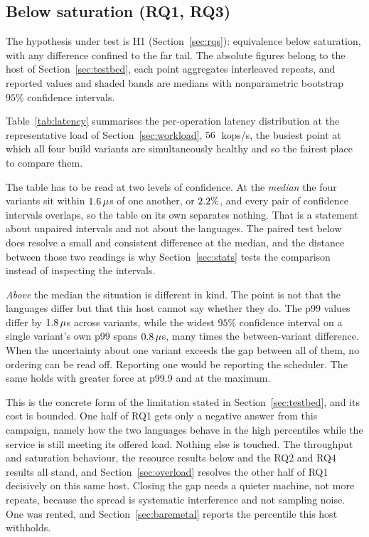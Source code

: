 \documentclass[english,oneside,a4paper,censored,csm,software-track-2020]{HYthesisML}
\begin{document}
\subsection{Below saturation (RQ1, RQ3)}\label{sec:perfresults}
The hypothesis under test is H1 (Section~\ref{sec:rqs}): equivalence below saturation, with any
difference confined to the far tail. The absolute figures belong to the host of
Section~\ref{sec:testbed}, each point aggregates \NRepeats{} interleaved repeats, and reported
values and shaded bands are medians with nonparametric bootstrap $95\%$ confidence intervals.

Table~\ref{tab:latency} summarises the per-operation latency distribution at the representative
load of Section~\ref{sec:workload}, $56$~kops/s, the busiest point at which all four build
variants are simultaneously healthy and so the fairest place to compare them.

The table has to be read at two levels of confidence. At the \emph{median} the four variants sit
within $1.6\,\mu$s of one another, or $2.2\%$, and every pair of confidence
intervals overlaps, so the table on its own separates nothing.
That is a statement about unpaired intervals and not about the languages. The paired test
below does resolve a small and consistent difference at the median, and the distance between
those two readings is why Section~\ref{sec:stats} tests the comparison instead of
inspecting the intervals.

\emph{Above} the median the situation is different in kind. The point is not that the languages
differ but that this host cannot say whether they do. The p99 values differ by
$1.8\,\mu$s across variants, while the widest $95\%$ confidence interval on a
single variant's own p99 spans $0.8\,\mu$s, many times the between-variant
difference. When the uncertainty about one variant exceeds the gap between all of them, no
ordering can be read off. Reporting one would be reporting the scheduler. The same holds
with greater force at p99.9 and at the maximum.

This is the concrete form of the limitation stated in Section~\ref{sec:testbed}, and its cost is
bounded. One half of RQ1 gets only a negative answer from this campaign, namely how the two
languages behave in the high percentiles while the service is still meeting its offered load.
Nothing else is touched. The throughput and saturation behaviour, the resource results below and
the RQ2 and RQ4 results all stand, and Section~\ref{sec:overload} resolves the other half of RQ1
decisively on this same host. Closing the gap needs a quieter machine, not more
repeats, because the spread is systematic interference and not sampling noise. One was rented, and
Section~\ref{sec:baremetal} reports the percentile this host withholds.
\end{document}
